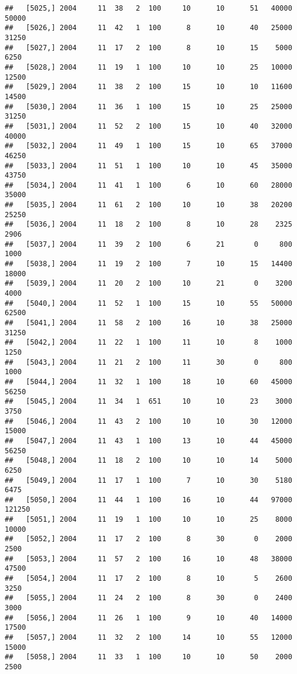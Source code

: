 \documentclass{article}\usepackage[]{graphicx}\usepackage[]{color}
\makeatletter
\newenvironment{kframe}{%
 \def\at@end@of@kframe{}%
 \ifinner\ifhmode%
  \def\at@end@of@kframe{\end{minipage}}%
  \begin{minipage}{\columnwidth}%
 \fi\fi%
 \def\FrameCommand##1{\hskip\@totalleftmargin \hskip-\fboxsep
 \colorbox{shadecolor}{##1}\hskip-\fboxsep
     \hskip-\linewidth \hskip-\@totalleftmargin \hskip\columnwidth}%
 \MakeFramed {\advance\hsize-\width
   \@totalleftmargin\z@ \linewidth\hsize
   \@setminipage}}%
 {\par\unskip\endMakeFramed%
 \at@end@of@kframe}
\newenvironment{knitrout}{}{} %
\makeatother
\begin{document}
\begin{knitrout}
\begin{kframe}
\begin{verbatim}
##   [5025,] 2004     11  38   2  100     10      10      51   40000   50000
##   [5026,] 2004     11  42   1  100      8      10      40   25000   31250
##   [5027,] 2004     11  17   2  100      8      10      15    5000    6250
##   [5028,] 2004     11  19   1  100     10      10      25   10000   12500
##   [5029,] 2004     11  38   2  100     15      10      10   11600   14500
##   [5030,] 2004     11  36   1  100     15      10      25   25000   31250
##   [5031,] 2004     11  52   2  100     15      10      40   32000   40000
##   [5032,] 2004     11  49   1  100     15      10      65   37000   46250
##   [5033,] 2004     11  51   1  100     10      10      45   35000   43750
##   [5034,] 2004     11  41   1  100      6      10      60   28000   35000
##   [5035,] 2004     11  61   2  100     10      10      38   20200   25250
##   [5036,] 2004     11  18   2  100      8      10      28    2325    2906
##   [5037,] 2004     11  39   2  100      6      21       0     800    1000
##   [5038,] 2004     11  19   2  100      7      10      15   14400   18000
##   [5039,] 2004     11  20   2  100     10      21       0    3200    4000
##   [5040,] 2004     11  52   1  100     15      10      55   50000   62500
##   [5041,] 2004     11  58   2  100     16      10      38   25000   31250
##   [5042,] 2004     11  22   1  100     11      10       8    1000    1250
##   [5043,] 2004     11  21   2  100     11      30       0     800    1000
##   [5044,] 2004     11  32   1  100     18      10      60   45000   56250
##   [5045,] 2004     11  34   1  651     10      10      23    3000    3750
##   [5046,] 2004     11  43   2  100     10      10      30   12000   15000
##   [5047,] 2004     11  43   1  100     13      10      44   45000   56250
##   [5048,] 2004     11  18   2  100     10      10      14    5000    6250
##   [5049,] 2004     11  17   1  100      7      10      30    5180    6475
##   [5050,] 2004     11  44   1  100     16      10      44   97000  121250
##   [5051,] 2004     11  19   1  100     10      10      25    8000   10000
##   [5052,] 2004     11  17   2  100      8      30       0    2000    2500
##   [5053,] 2004     11  57   2  100     16      10      48   38000   47500
##   [5054,] 2004     11  17   2  100      8      10       5    2600    3250
##   [5055,] 2004     11  24   2  100      8      30       0    2400    3000
##   [5056,] 2004     11  26   1  100      9      10      40   14000   17500
##   [5057,] 2004     11  32   2  100     14      10      55   12000   15000
##   [5058,] 2004     11  33   1  100     10      10      50    2000    2500

\end{verbatim}
\end{kframe}
\end{knitrout}
\end{document}
